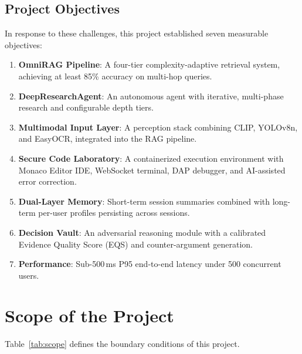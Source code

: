 \subsection{Project Objectives}
\label{subsec:objectives}

In response to these challenges, this project established seven measurable objectives:

\begin{enumerate}
    \item \textbf{OmniRAG Pipeline}: A four-tier complexity-adaptive retrieval system, achieving at least 85\% accuracy on multi-hop queries.
    \item \textbf{DeepResearchAgent}: An autonomous agent with iterative, multi-phase research and configurable depth tiers.
    \item \textbf{Multimodal Input Layer}: A perception stack combining CLIP, YOLOv8n, and EasyOCR, integrated into the RAG pipeline.
    \item \textbf{Secure Code Laboratory}: A containerized execution environment with Monaco Editor IDE, WebSocket terminal, DAP debugger, and AI-assisted error correction.
    \item \textbf{Dual-Layer Memory}: Short-term session summaries combined with long-term per-user profiles persisting across sessions.
    \item \textbf{Decision Vault}: An adversarial reasoning module with a calibrated Evidence Quality Score (EQS) and counter-argument generation.
    \item \textbf{Performance}: Sub-500\,ms P95 end-to-end latency under 500 concurrent users.
\end{enumerate}

\section{Scope of the Project}
\label{sec:scope}

Table~\ref{tab:scope} defines the boundary conditions of this project.

